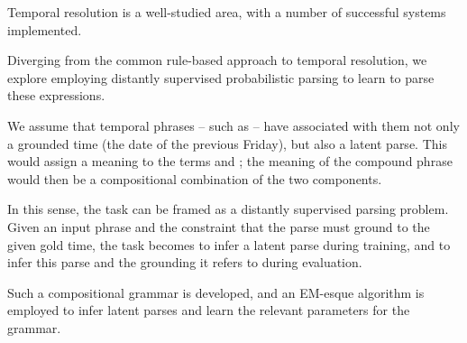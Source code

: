 
Temporal resolution is a well-studied area, with a number of successful systems
	implemented.



Diverging from the common rule-based approach to temporal resolution,
	we explore employing distantly supervised probabilistic parsing
	to learn to parse these expressions.

We assume that temporal phrases -- such as  -- have
	associated with them not only a grounded time (the date of the previous
	Friday), but also a latent parse.
This would assign a meaning to the terms  and ; the
	meaning of the compound phrase would then be a compositional combination
	of the two components.

In this sense, the task can be framed as a distantly supervised parsing
	problem.
Given an input phrase and the constraint that the parse must ground to the
	given gold time, the task becomes to infer a latent parse during
	training, and to infer this parse and the grounding it refers to during
	evaluation.

Such a compositional grammar is developed, and an EM-esque algorithm is
	employed to infer latent parses and learn the relevant parameters for
	the grammar.


